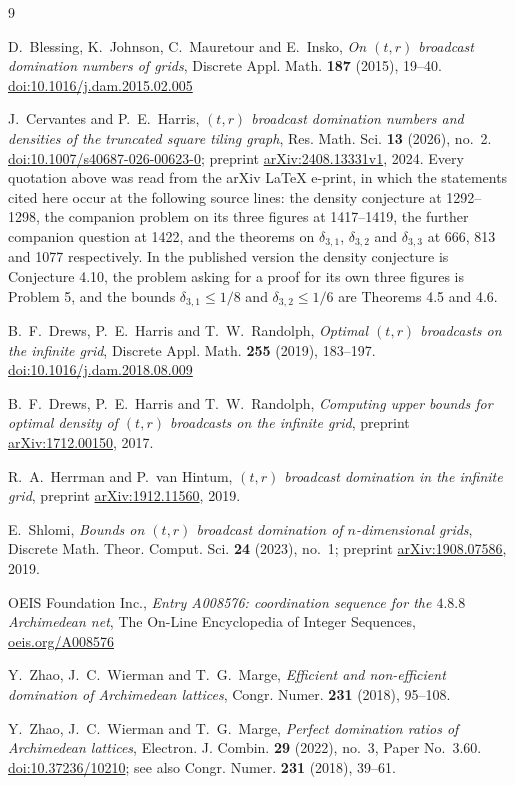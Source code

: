 \documentclass[11pt]{amsart}
\theoremstyle{definition}
\begin{document}
\begin{thebibliography}{9}

D.~Blessing, K.~Johnson, C.~Mauretour and E.~Insko,
\emph{On $(t,r)$ broadcast domination numbers of grids},
Discrete Appl. Math. \textbf{187} (2015), 19--40.
\href{https://doi.org/10.1016/j.dam.2015.02.005}{doi:10.1016/j.dam.2015.02.005}

J.~Cervantes and P.~E.~Harris,
\emph{$(t,r)$ broadcast domination numbers and densities of the truncated square tiling graph},
Res. Math. Sci. \textbf{13} (2026), no.~2.
\href{https://doi.org/10.1007/s40687-026-00623-0}{doi:10.1007/s40687-026-00623-0};
preprint \href{https://arxiv.org/abs/2408.13331}{arXiv:2408.13331v1}, 2024.
Every quotation above was read from the arXiv \LaTeX{} e-print, in which the statements cited
here occur at the following source lines: the density conjecture at 1292--1298, the companion
problem on its three figures at 1417--1419, the further companion question at 1422, and the
theorems on $\delta_{3,1}$, $\delta_{3,2}$ and $\delta_{3,3}$ at 666, 813 and 1077
respectively. In the published version the density conjecture is Conjecture 4.10, the problem
asking for a proof for its own three figures is Problem 5, and the bounds
$\delta_{3,1}\leq 1/8$ and $\delta_{3,2}\leq 1/6$ are Theorems 4.5 and 4.6.

B.~F.~Drews, P.~E.~Harris and T.~W.~Randolph,
\emph{Optimal $(t,r)$ broadcasts on the infinite grid},
Discrete Appl. Math. \textbf{255} (2019), 183--197.
\href{https://doi.org/10.1016/j.dam.2018.08.009}{doi:10.1016/j.dam.2018.08.009}

B.~F.~Drews, P.~E.~Harris and T.~W.~Randolph,
\emph{Computing upper bounds for optimal density of $(t,r)$ broadcasts on the infinite grid},
preprint \href{https://arxiv.org/abs/1712.00150}{arXiv:1712.00150}, 2017.

R.~A.~Herrman and P.~van Hintum,
\emph{$(t,r)$ broadcast domination in the infinite grid},
preprint \href{https://arxiv.org/abs/1912.11560}{arXiv:1912.11560}, 2019.

E.~Shlomi,
\emph{Bounds on $(t,r)$ broadcast domination of $n$-dimensional grids},
Discrete Math. Theor. Comput. Sci. \textbf{24} (2023), no.~1;
preprint \href{https://arxiv.org/abs/1908.07586}{arXiv:1908.07586}, 2019.

OEIS Foundation Inc.,
\emph{Entry A008576: coordination sequence for the $4.8.8$ Archimedean net},
The On-Line Encyclopedia of Integer Sequences,
\href{https://oeis.org/A008576}{oeis.org/A008576}

Y.~Zhao, J.~C.~Wierman and T.~G.~Marge,
\emph{Efficient and non-efficient domination of Archimedean lattices},
Congr. Numer. \textbf{231} (2018), 95--108.

Y.~Zhao, J.~C.~Wierman and T.~G.~Marge,
\emph{Perfect domination ratios of Archimedean lattices},
Electron. J. Combin. \textbf{29} (2022), no.~3, Paper No.~3.60.
\href{https://doi.org/10.37236/10210}{doi:10.37236/10210};
see also Congr. Numer. \textbf{231} (2018), 39--61.

\end{thebibliography}
\end{document}
